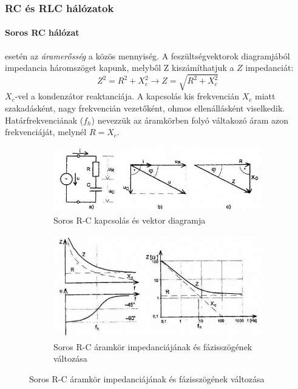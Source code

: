 \subsubsection{RC és RLC hálózatok}
\paragraph{Soros RC hálózat} esetén az \emph{áramerősség} a közös mennyiség. A feszültségvektorok diagramjából impedancia háromszöget kapunk, melyből Z kiszámíthatjuk a $Z$ impedanciát:
$$Z^2 = R^2 + X_c^2 \rightarrow Z = \sqrt{R^2 + X_c^2}$$
$X_c$-vel a kondenzátor reaktanciája.
A kapcsolás kis frekvencián $X_c$ miatt szakadásként, nagy frekvencián vezetőként, ohmos ellenállásként viselkedik. Határfrekvenciának ($f_h$) nevezzük az áramkörben folyó váltakozó áram azon frekvenciáját, melynél $ R = X_c$.
\begin{figure}[h]
	\centering
	\begin{subfigure}[b]{0.45\textwidth}
		\includegraphics[width=\linewidth]{fig/10-serialRC_Schematic}
		\caption{Soros R-C kapcsolás és vektor diagramja}
		\label{fig:10-serialrcschematic}
	\end{subfigure}
	\begin{subfigure}[b]{0.45\textwidth}
		\includegraphics[width=\linewidth]{fig/10-serialRC_Plot}
		\caption{Soros R-C áramkör impedanciájának és fázisszögének változása}
		\label{fig:10-serialrcplot}
	\end{subfigure}
\end{figure}

